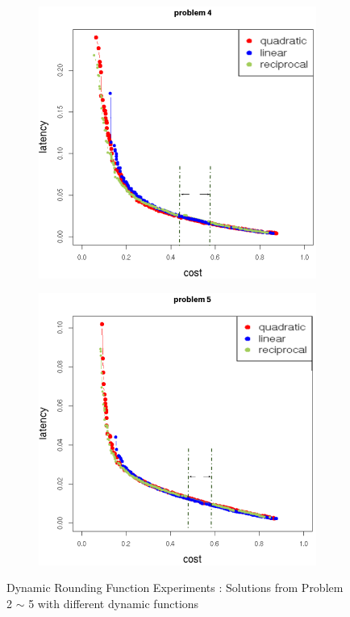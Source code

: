 \begin{figure}[h!]
\begin{subfigure}{0.49\textwidth}
	   \caption{}
   \end{subfigure}
   \begin{subfigure}{0.49\textwidth}
       \includegraphics[width=\textwidth]{pics/dynamic_problem_4.png}
	   \caption{}
   \end{subfigure}
   \begin{subfigure}{0.49\textwidth}
       \includegraphics[width=\textwidth]{pics/dynamic_problem_5.png}
	   \caption{}
   \end{subfigure}
   \caption{Dynamic Rounding Function Experiments : Solutions from Problem 2 $\sim$ 5 with different dynamic functions}
   \label{fig:dynamicFunctions}
\end{figure}



